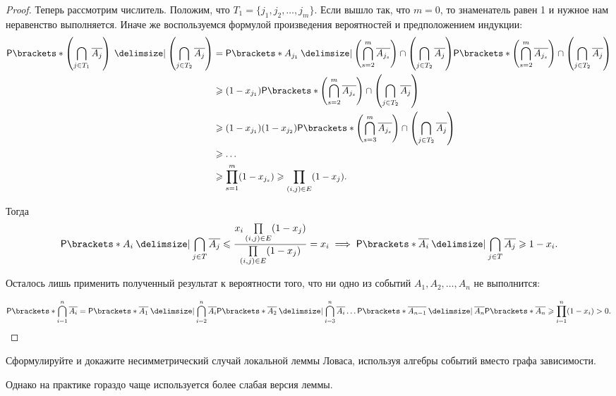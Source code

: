 \begin{proof}
    Теперь рассмотрим числитель. Положим, что \(T_1 = \{j_{1}, j_{2}, \dots, j_{m}\}\). Если вышло так, что \(m = 0\), то знаменатель равен 1 и нужное нам неравенство выполняется. Иначе же воспользуемся формулой произведения вероятностей и предположением индукции:
    \[\begin{aligned}
    \Pr{\left(\bigcap\limits_{j \in T_1} \overline{A_j}\right) \given \left(\bigcap\limits_{j \in T_2} \overline{A_j}\right)} &= \Pr{A_{j_1} \given \left(\bigcap\limits_{s = 2}^{m}\overline{A_{j_s}}\right) \cap \left(\bigcap\limits_{j \in T_2} \overline{A_j}\right)}\Pr{\left(\bigcap\limits_{s = 2}^{m}\overline{A_{j_s}}\right) \cap \left(\bigcap\limits_{j \in T_2} \overline{A_j}\right)} \\
    &\geq (1 - x_{j_1})\Pr{\left(\bigcap\limits_{s = 2}^{m}\overline{A_{j_s}}\right) \cap \left(\bigcap\limits_{j \in T_2} \overline{A_j}\right)} \\
    &\geq (1 - x_{j_1})(1 - x_{j_2})\Pr{\left(\bigcap\limits_{s = 3}^{m}\overline{A_{j_s}}\right) \cap \left(\bigcap\limits_{j \in T_2} \overline{A_j}\right)} \\
    &\geq \dots \\
    &\geq \prod_{s = 1}^{m} (1 - x_{j_s}) \geq \prod\limits_{(i, j) \in E} (1 - x_j).
    \end{aligned}\]
    
    Тогда
    \[\Pr{A_i \given \bigcap_{j \in T} \overline{A_j}} \leq \frac{x_i \prod\limits_{(i, j) \in E} (1 - x_j)}{\prod\limits_{(i, j) \in E} (1 - x_j)} = x_i \implies \Pr{\overline{A_i} \given \bigcap_{j \in T} \overline{A_j}} \geq 1 - x_i.\]
    
    Осталось лишь применить полученный результат к вероятности того, что ни одно из событий \(A_1, A_2, \dots, A_n\) не выполнится:
    
    \[\Pr{\bigcap\limits_{i = 1}^{n} \overline{A_i}} = \Pr{\overline{A_1} \given \bigcap\limits_{i = 2}^{n} \overline{A_i}}\Pr{\overline{A_2} \given \bigcap\limits_{i = 3}^{n} \overline{A_i}}\dotsc\Pr{\overline{A_{n - 1}} \given \overline{A_n}}\Pr{\overline{A_n}} \geq \prod\limits_{i = 1}^{n}(1 - x_i) > 0. \qedhere\]
\end{proof}
\begin{exercise}
    Сформулируйте и докажите несимметрический случай локальной леммы Ловаса, используя алгебры событий вместо графа зависимости.
\end{exercise}

Однако на практике гораздо чаще используется более слабая версия леммы.

